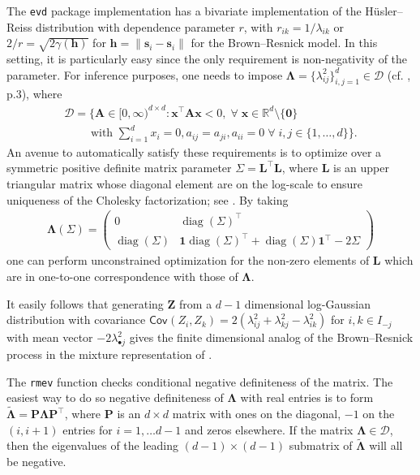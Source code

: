 \documentclass{article}
\newcommand{\all}{ \; \forall \;}
\newcommand{\bs}[1]{\boldsymbol {#1}}
\newcommand{\R}{\mathbb{R}}
\newcommand{\Co}[2][]{{\mathsf{Cov}_{#1}}\left(#2\right)}
\DeclareMathOperator{\diag}{diag}
\begin{document}
\begin{enumerate}
The \texttt{evd} package implementation has a bivariate implementation
of the  H\"usler--Reiss distribution with dependence parameter $r$, with $r_{ik}=1/\lambda_{ik}$ or  
$2/r=\sqrt{2\gamma(\bs{h})}$ for $\bs{h}=\|\bs{s}_i-\bs{s}_i\|$ for the Brown--Resnick model. In this setting, it is particularly 
easy since the only requirement is 
non-negativity of the parameter. For inference purposes, one needs to impose  $\bs{\Lambda}=\{\lambda_{ij}^2\}_{i, j=1}^d \in 
\mathcal{D}$ (cf. \cite{Engelke:2015}, p.3), where
\begin{multline*}
   \mathcal{D}=\Biggl\{\mathbf{A}\in [0, \infty)^{d\times d}: \bs{x}^\top\!\!\mathbf{A}\bs{x} <0, \all \bs{x} \in \R^{d}
\setminus\{\bs{0}\} \\ \qquad 
\text{ with } \sum_{i=1}^d x_i=0, a_{ij}=a_{ji}, a_{ii}=0 \all i, j \in \{1,\ldots, d\}\Biggr\}.
\end{multline*}
An avenue to automatically satisfy these requirements is to optimize over a symmetric  positive definite  matrix parameter
$\bs{\varSigma}=\mathbf{L}^\top\mathbf{L}$, where $\mathbf{L}$ is an upper triangular matrix whose diagonal element are on the 
log-scale to ensure uniqueness of the Cholesky factorization; see \cite{Pinheiro:1996}. By taking 
\begin{align*}
   \bs{\Lambda}(\bs{\varSigma})= \begin{pmatrix} 0 & \diag (\bs{\varSigma})^\top \\ \diag(\bs{\varSigma}) & 
\bs{1}\diag(\bs{\varSigma})^\top 
+ \diag(\bs{\varSigma})\bs{1}^\top - 2 \bs{\varSigma}
\end{pmatrix}
\end{align*}
one can perform unconstrained optimization for the non-zero elements of $\mathbf{L}$ which are in one-to-one correspondence 
with those of $\bs{\Lambda}$.

It easily follows that generating $\bs{Z}$ from a $d-1$ dimensional log-Gaussian distribution with covariance $\Co{Z_i, 
Z_k}=2(\lambda_{ij}^2+\lambda_{kj}^2-\lambda_{ik}^2)$ for $i, 
k \in I_{-j}$ with mean vector $-2\lambda_{\bullet j}^2$  gives 
the finite dimensional analog of the Brown--Resnick process in the mixture representation of \cite{Dombry:2016}.

The \texttt{rmev} function checks conditional negative definiteness of the matrix. The easiest way to do so 
negative definiteness of $\bs{\Lambda}$ with real entries is to form $\tilde{\bs{\Lambda}}=\mathbf{P}\bs{\Lambda}\mathbf{P}^\top$, where $\mathbf{P}$
is an $d \times d$ matrix with ones on the diagonal, $-1$ on the $(i, i+1)$ entries for $i=1, \ldots d-1$ and zeros elsewhere.
If the matrix $\bs{\Lambda} \in \mathcal{D}$, then the eigenvalues of the leading $(d-1) \times (d-1)$ submatrix of $\tilde{\bs{\Lambda}}$ 
will all be negative.


\end{enumerate}
\end{document}
